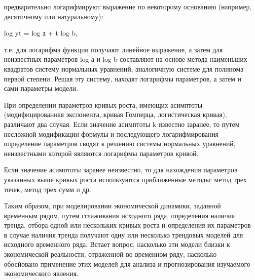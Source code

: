 предварительно логарифмируют выражение по некоторому основанию (например, десятичному или натуральному):

log yt = log а + t log b,

т.е. для логарифма функции получают линейное выражение, а затем для неизвестных параметров log а и log b составляют на основе метода наименьших квадратов систему нормальных уравнений, аналогичную системе для полинома первой степени. Решая эту систему, находят логарифмы параметров, а затем и сами параметры модели.

При определении параметров кривых роста, имеющих асимптоты (модифицированная экспонента, кривая Гомперца, логистическая кривая), различают два случая. Если значение асимптоты k известно заранее, то путем несложной модификации формулы и последующего логарифмирования определение параметров сводят к решению системы нормальных уравнений, неизвестными которой являются логарифмы параметров кривой.

Если значение асимптоты заранее неизвестно, то для нахождения параметров указанных выше кривых роста используются приближенные методы: метод трех точек, метод трех сумм и др.

Таким образом, при моделировании экономической динамики, заданной временным рядом, путем сглаживания исходного ряда, определения наличия тренда, отбора одной или нескольких кривых роста и определения их параметров в случае наличия тренда получают одну или несколько трендовых моделей для исходного временного ряда. Встает вопрос, насколько эти модели близки к экономической реальности, отраженной во временном ряду, насколько обосйовано применение этих моделей для анализа и прогнозирования изучаемого экономического явления.


























